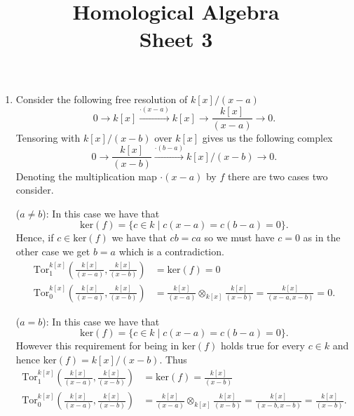 \documentclass[a4paper]{article}
\title{Homological Algebra \\ Sheet 3}
\begin{document}
\maketitle
\begin{exercise}{2}
  \begin{enumerate}[label=(\roman*)]
    \item Consider the following free resolution of $ k[x]/(x-a) $
      \begin{equation*}
        0 \to k[x] \xrightarrow{\cdot (x - a)} k[x] \to \frac{k[x]}{(x-a)} \to 0.
      \end{equation*}
      Tensoring with $ k[x]/(x - b) $ over $ k[x] $ gives us the following complex
      \begin{equation*}
        0 \to \frac{k[x]}{(x-b)} \xrightarrow{ \cdot (b - a)} k[x]/(x - b) \to 0
      .\end{equation*}
      Denoting the multiplication map $ \cdot (x - a) $ by $ f $ there are two cases two consider.

      ($ a \neq b $): In this case we have that
      \begin{equation*}
        \text{ker}(f) = \{c \in k \mid c(x - a) = c(b - a) = 0\}.
      \end{equation*}
      Hence, if $ c \in \text{ker}(f) $ we have that $ c b = ca $ so we must have $ c = 0 $ as in the other case we get $ b = a $ which is a contradiction.
      \begin{align*}
        \text{Tor}_1^{k[x]} \left( \frac{k[x]}{(x-a)}, \frac{k[x]}{(x - b)} \right) &= \text{ker}(f) = 0 \\
        \text{Tor}_0^{k[x]} \left( \frac{k[x]}{(x-a)}, \frac{k[x]}{(x - b)} \right) &= \frac{k[x]}{(x- a)} \otimes_{k[x]} \frac{k[x]}{(x - b)} = \frac{k[x]}{(x-a,x-b)} = 0.
      \end{align*}

      ($ a = b $): In this case we have that
      \begin{equation*}
        \text{ker}(f) = \{c \in k \mid c(x - a) = c(b - a) = 0\}.
      \end{equation*}
      However this requirement for being in $ \text{ker}(f) $ holds true for every $ c \in k $ and hence $ \text{ker}(f) = k[x]/(x - b) $. Thus
      \begin{align*}
        \text{Tor}_1^{k[x]}\left( \frac{k[x]}{(x-a)}, \frac{k[x]}{(x - b)} \right) &= \text{ker}(f) = \frac{k[x]}{(x - b)} \\
        \text{Tor}_0^{k[x]} \left( \frac{k[x]}{(x-a)}, \frac{k[x]}{(x - b)} \right) &= \frac{k[x]}{(x- a)} \otimes_{k[x]} \frac{k[x]}{(x - b)} = \frac{k[x]}{(x-b,x-b)} = \frac{k[x]}{(x - b)}
      .\end{align*}


\end{enumerate}
\end{exercise}
\end{document}
